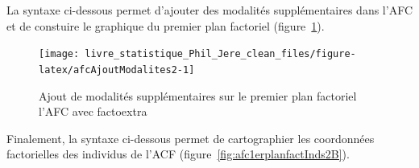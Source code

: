 \documentclass[
  11pt,
  french,
]{book}
\makeatletter
\newenvironment{Shaded}{\begin{snugshade}}{\end{snugshade}}
\newcommand{\CommentTok}[1]{\textcolor[rgb]{0.56,0.35,0.01}{\textit{#1}}}
\newcommand{\DataTypeTok}[1]{\textcolor[rgb]{0.13,0.29,0.53}{#1}}
\newcommand{\DecValTok}[1]{\textcolor[rgb]{0.00,0.00,0.81}{#1}}
\newcommand{\KeywordTok}[1]{\textcolor[rgb]{0.13,0.29,0.53}{\textbf{#1}}}
\newcommand{\NormalTok}[1]{#1}
\newcommand{\OperatorTok}[1]{\textcolor[rgb]{0.81,0.36,0.00}{\textbf{#1}}}
\newcommand{\OtherTok}[1]{\textcolor[rgb]{0.56,0.35,0.01}{#1}}
\newcommand{\StringTok}[1]{\textcolor[rgb]{0.31,0.60,0.02}{#1}}
\newenvironment{kframe}{%
\medskip{}
\setlength{\fboxsep}{.8em}
 \def\at@end@of@kframe{}%
 \ifinner\ifhmode%
  \def\at@end@of@kframe{\end{minipage}}%
  \begin{minipage}{\columnwidth}%
 \fi\fi%
 \def\FrameCommand##1{\hskip\@totalleftmargin \hskip-\fboxsep
 \colorbox{shadecolor}{##1}\hskip-\fboxsep
     \hskip-\linewidth \hskip-\@totalleftmargin \hskip\columnwidth}%
 \MakeFramed {\advance\hsize-\width
   \@totalleftmargin\z@ \linewidth\hsize
   \@setminipage}}%
 {\par\unskip\endMakeFramed%
 \at@end@of@kframe}
\renewenvironment{Shaded}{\begin{kframe}}{\end{kframe}}
\makeatother
\begin{document}
La syntaxe ci-dessous permet d'ajouter des modalités supplémentaires dans l'AFC et de constuire le graphique du premier plan factoriel (figure~\ref{fig:afcAjoutModalites2}).

\begin{Shaded}
\end{Shaded}

\begin{figure}[H]

{\centering \texttt{[image: livre\_statistique\_Phil\_Jere\_clean\_files/figure-latex/afcAjoutModalites2-1]} 

}

\caption{Ajout de modalités supplémentaires sur le premier plan factoriel l'AFC avec factoextra}\label{fig:afcAjoutModalites2}
\end{figure}

Finalement, la syntaxe ci-dessous permet de cartographier les coordonnées factorielles des individus de l'ACF (figure~\ref{fig:afc1erplanfactInds2B}).
\end{document}
